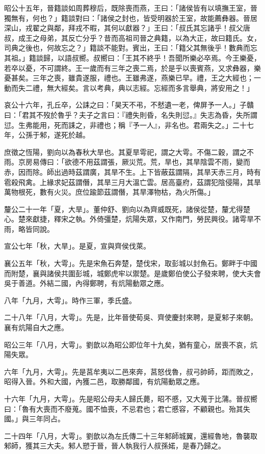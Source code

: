 \begin{pinyinscope}
昭公十五年，晉籍談如周葬穆后，既除喪而燕，王曰：「諸侯皆有以填撫王室，晉獨無有，何也？」籍談對曰：「諸侯之封也，皆受明器於王室，故能薦彝器。晉居深山，戎翟之與鄰，拜戎不暇，其何以獻器？」王曰：「叔氏其忘諸乎！叔父唐叔，成王之母弟，其反亡分乎？昔而高祖司晉之典籍，以為大正，故曰籍氏。女，司典之後也，何故忘之？」籍談不能對。賓出，王曰：「籍父其無後乎！數典而忘其祖。」籍談歸，以語叔嚮。叔嚮曰：「王其不終乎！吾聞所樂必卒焉。今王樂憂，若卒以憂，不可謂終。王一歲而有三年之喪二焉，於是乎以喪賓燕，又求彝器，樂憂甚矣。三年之喪，雖貴遂服，禮也。王雖弗遂，燕樂已早。禮，王之大經也；一動而失二禮，無大經矣。言以考典，典以志經。忘經而多言舉典，將安用之！」

哀公十六年，孔丘卒，公誄之曰：「昊天不弔，不憖遺一老，俾屏予一人。」子贛曰：「君其不歿於魯乎？夫子之言曰：『禮失則昏，名失則愆。』失志為昏，失所謂愆。生弗能用，死而誄之，非禮也；稱『予一人』，非名也。君兩失之。」二十七年，公孫于邾，遂死於越。

庶徵之恆陽，劉向以為春秋大旱也。其夏旱雩祀，謂之大雩。不傷二穀，謂之不雨。京房易傳曰：「欲德不用茲謂張，厥災荒。荒，旱也，其旱陰雲不雨，變而赤，因而除。師出過時茲謂廣，其旱不生。上下皆蔽茲謂隔，其旱天赤三月，時有雹殺飛禽。上緣求妃茲謂僭，其旱三月大溫亡雲。居高臺府，茲謂犯陰侵陽，其旱萬物根死，數有火災。庶位踰節茲謂僭，其旱澤物枯，為火所傷。」

釐公二十一年「夏，大旱」。董仲舒、劉向以為齊威既死，諸侯從楚，釐尤得楚心。楚來獻捷，釋宋之執。外倚彊楚，炕陽失眾，又作南門，勞民興役。諸雩旱不雨，略皆同說。

宣公七年「秋，大旱」。是夏，宣與齊侯伐萊。

襄公五年「秋，大雩」。先是宋魚石奔楚，楚伐宋，取彭城以封魚石。鄭畔于中國而附楚，襄與諸侯共圍彭城，城鄭虎牢以禦楚。是歲鄭伯使公子發來聘，使大夫會吳于善道。外結二國，內得鄭聘，有炕陽動眾之應。

八年「九月，大雩」。時作三軍，季氏盛。

二十八年「八月，大雩」。先是，比年晉使荀吳、齊使慶封來聘，是夏邾子來朝。襄有炕陽自大之應。

昭公三年「八月，大雩」。劉歆以為昭公即位年十九矣，猶有童心，居喪不哀，炕陽失眾。

六年「九月，大雩」。先是莒牟夷以二邑來奔，莒怒伐魯，叔弓帥師，距而敗之，昭得入晉。外和大國，內獲二邑，取勝鄰國，有炕陽動眾之應。

十六年「九月，大雩」。先是昭公母夫人歸氏薨，昭不慼，又大蒐于比蒲。晉叔嚮曰：「魯有大喪而不廢蒐。國不恤喪，不忌君也；君亡慼容，不顧親也。殆其失國。」與三年同占。

二十四年「八月，大雩」。劉歆以為左氏傳二十三年邾師城翼，還經魯地，魯襲取邾師，獲其三大夫。邾人愬于晉，晉人執我行人叔孫婼，是春乃歸之。


\end{pinyinscope}
